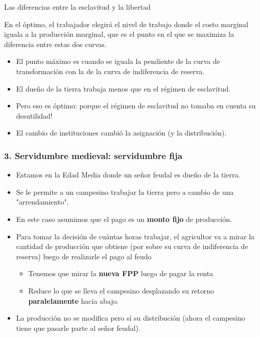 \documentclass{beamer}
\begin{document}
\begin{frame}{Las diferencias entre la esclavitud y la libertad}
        \begin{boxB}
        \centering
        En el óptimo, el trabajador elegirá el nivel de trabajo donde el costo marginal iguala a la producción marginal, que es el punto en el que se maximiza la diferencia entre estas dos curvas.
        \end{boxB}
        \begin{itemize}
        \item El punto máximo es cuando se iguala la pendiente de la curva de transformación con la de la curva de indiferencia de reserva. 
        \item El dueño de la tierra trabaja menos que en el régimen de esclavitud.
        \item Pero eso es óptimo: porque el régimen de esclavitud no tomaba en cuenta su desutilidad!
        \item El cambio de instituciones cambió la asignación (y la distribución).
    \end{itemize}
\end{frame}


\begin{frame}
\frametitle{3. Servidumbre medieval: servidumbre fija }
\begin{itemize}
    \item Estamos en la Edad Media donde un señor feudal es dueño de la tierra. 
    \item Se le permite a un campesino trabajar la tierra pero a cambio de una "arrendamiento". 
    \item  En este caso asumimos que el pago es un \textbf{monto fijo} de producción. \vspace{1mm}
    \item Para tomar la decisión de cuántas horas trabajar, el agricultor va a mirar la cantidad de producción que obtiene (por sobre su curva de indiferencia de reserva) luego de realizarle el pago al feudo \vspace{1mm}
        \begin{itemize}
        \item Tenemos que mirar la \textbf{nueva FPP} luego de pagar la renta
        \item Reduce lo que se lleva el campesino desplazando su retorno \textbf{paralelamente} hacia abajo. \vspace{1mm}
        \end{itemize}
    \item La producción no se modifica pero sí su distribución (ahora el campesino tiene que pasarle parte al señor feudal). 
\end{itemize}
\end{frame}
\end{document}
